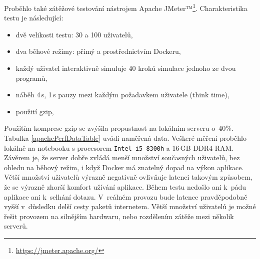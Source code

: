 Proběhlo také zátěžové testování nástrojem Apache JMeter™\footnote{\url{https://jmeter.apache.org/}}.
Charakteristika testu je následující:
\begin{itemize}
    \item dvě velikosti testu: 30 a 100 uživatelů,
    \item dva běhové režimy: přímý a prostřednictvím Dockeru,
    \item každý uživatel interaktivně simuluje 40 kroků simulace jednoho ze dvou programů,
    \item náběh 4\,s, 1\,s pauzy mezi každým požadavkem uživatele (think time),
    \item použití gzip,
\end{itemize}
Použitím komprese gzip se zvýšila propustnost na lokálním serveru o~40\%.
Tabulka \ref{apachePerfDataTable} uvádí naměřená data.
Veškeré měření proběhlo lokálně na notebooku s procesorem \texttt{Intel i5 8300h} a 16\,GB DDR4 RAM.
Závěrem je, že server dobře zvládá menší množství současných uživatelů, bez ohledu na běhový režim, i když Docker má znatelný dopad na výkon aplikace.
Větší množství uživatelů výrazně negativně ovlivňuje latenci takovým způsobem, že se výrazně zhorší komfort užívání aplikace.
Během testu nedošlo ani k~pádu aplikace ani k~selhání dotazu.
V~reálném provozu bude latence pravděpodobně vyšší v~důsledku delší cesty paketů internetem.
Větší množství uživatelů je možné řešit provozem na silnějším hardwaru, nebo rozdělením zátěže mezi několik serverů.

